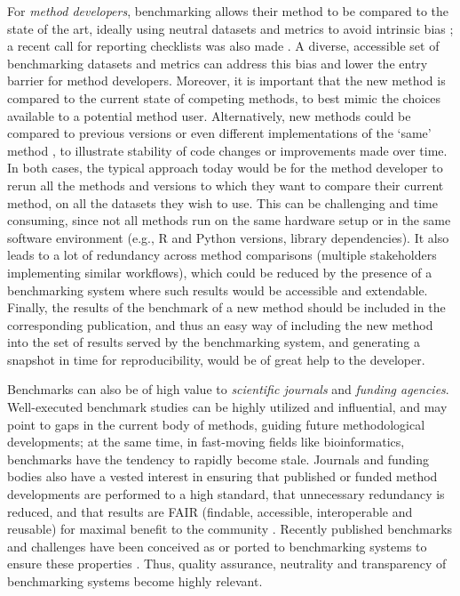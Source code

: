 \documentclass[11pt]{article}
\begin{document}
For \emph{method developers}, benchmarking allows their method to be compared to the state of the art, ideally using neutral datasets and metrics to avoid intrinsic bias \cite{Boulesteix2013-vy, Weber2019-el}; a recent call for reporting checklists was also made \cite{Brooks2024-rq}. A diverse, accessible set of benchmarking datasets and metrics can address this bias and lower the entry barrier for method developers. Moreover, it is important that the new method is compared to the current state of competing methods, to best mimic the choices available to a potential method user. Alternatively, new methods could be compared to previous versions or even different implementations of the `same' method \cite{Rich2024-jh}, to illustrate stability of code changes or improvements made over time. In both cases, the typical approach today would be for the method developer to rerun all the methods and versions to which they want to compare their current method, on all the datasets they wish to use. This can be challenging and time consuming, since not all methods run on the same hardware setup or in the same software environment (e.g., R and Python versions, library dependencies). It also leads to a lot of redundancy across method comparisons (multiple stakeholders implementing similar workflows), which could be reduced by the presence of a benchmarking system where such results would be accessible and extendable. Finally, the results of the benchmark of a new method should be included in the corresponding publication, and thus an easy way of including the new method into the set of results served by the benchmarking system, and generating a snapshot in time for reproducibility, would be of great help to the developer. 

Benchmarks can also be of high value to \emph{scientific journals} and \emph{funding agencies}. Well-executed benchmark studies can be highly utilized and influential, and may point to gaps in the current body of methods, guiding future methodological developments; at the same time, in fast-moving fields like bioinformatics, benchmarks have the tendency to rapidly become stale. Journals and funding bodies also have a vested interest in ensuring that published or funded method developments are performed to a high standard, that unnecessary redundancy is reduced, and that results are FAIR (findable, accessible, interoperable and reusable) for maximal benefit to the community \cite{Wilkinson2016-bh}. Recently published benchmarks and challenges have been conceived as or ported to benchmarking systems to ensure these properties \cite{Nevers_2022,Bryce_Smith_2023, Pardo_Palacios_2023}. Thus, quality assurance, neutrality and transparency of benchmarking systems become highly relevant. 
\end{document}
